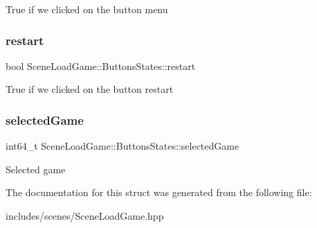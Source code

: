 True if we clicked on the button menu \mbox{\label{struct_scene_load_game_1_1_buttons_states_a22a840d0d58839802816cce823f034a3}} 
\subsubsection{\texorpdfstring{restart}{restart}}
{\footnotesize\ttfamily bool Scene\+Load\+Game\+::\+Buttons\+States\+::restart}

True if we clicked on the button restart \mbox{\label{struct_scene_load_game_1_1_buttons_states_a23e5e1bfc6c0fcd8362501554db4c015}} 
\subsubsection{\texorpdfstring{selected\+Game}{selectedGame}}
{\footnotesize\ttfamily int64\+\_\+t Scene\+Load\+Game\+::\+Buttons\+States\+::selected\+Game}

Selected game 

The documentation for this struct was generated from the following file\+:\begin{DoxyCompactItemize}
\item 
includes/scenes/Scene\+Load\+Game.\+hpp\end{DoxyCompactItemize}
